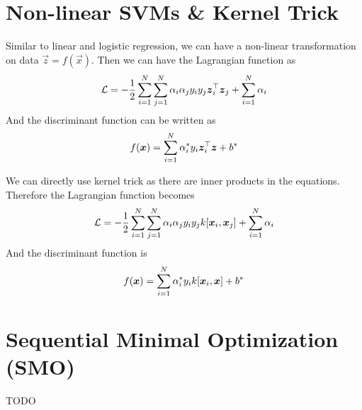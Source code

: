 \section{Non-linear SVMs \& Kernel Trick}
\label{section8.5}

Similar to linear and logistic regression, we can have a non-linear transformation on data $\vec{z}=f(\vec{x})$. Then we can have the Lagrangian function as
\begin{align*}
	\mathcal{L}=-\frac{1}{2}\sum_{i=1}^N\sum_{j=1}^N\alpha_i\alpha_jy_iy_j\boldsymbol{z}_i^\top\boldsymbol{z}_j+\sum_{i=1}^N\alpha_i
\end{align*}
And the discriminant function can be written as
\begin{align*}
	f(\boldsymbol{x})=\sum_{i=1}^N\alpha_i^*y_i\boldsymbol{z}_i^\top\boldsymbol{z}+b^*
\end{align*}

We can directly use kernel trick as there are inner products in the equations. Therefore the Lagrangian function becomes
\begin{align*}
	\mathcal{L}=-\frac{1}{2}\sum_{i=1}^N\sum_{j=1}^N\alpha_i\alpha_jy_iy_jk[\boldsymbol{x}_i,\boldsymbol{x}_j]+\sum_{i=1}^N\alpha_i
\end{align*}
And the discriminant function is
\begin{align*}
	f(\boldsymbol{x})=\sum_{i=1}^N\alpha_i^*y_ik[\boldsymbol{x}_i,\boldsymbol{x}]+b^*
\end{align*}



\section{Sequential Minimal Optimization (SMO)}

TODO
